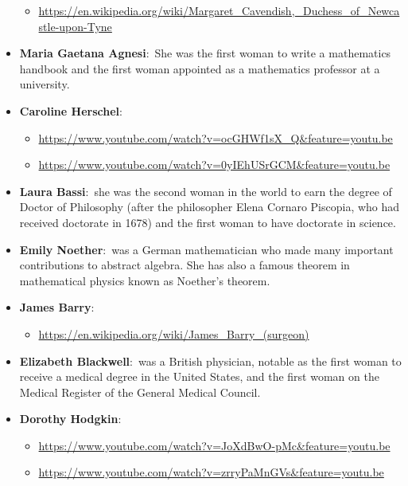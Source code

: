 \documentclass[11pt,a4paper]{article}
\begin{document}
\begin{itemize}
    \begin{itemize}
      \item[] \url{https://en.wikipedia.org/wiki/Margaret_Cavendish,_Duchess_of_Newcastle-upon-Tyne}
    \end{itemize}
    \item \textbf{Maria Gaetana Agnesi}:\ She was the first woman to write a mathematics handbook and the first woman appointed as a mathematics professor at a university.
    \item \textbf{Caroline Herschel}:\ 
    \begin{itemize}
      \item[] \url{https://www.youtube.com/watch?v=ocGHWf1sX_Q&feature=youtu.be}
      \item[] \url{https://www.youtube.com/watch?v=0yIEhUSrGCM&feature=youtu.be}  
    \end{itemize} 
    \item \textbf{Laura Bassi}:\ she was the second woman in the world to earn the degree of Doctor of Philosophy (after the philosopher Elena Cornaro Piscopia, who had received 
    doctorate in 1678) and the first woman to have doctorate in science.
    \item \textbf{Emily Noether}:\ was a German mathematician who made many important contributions to abstract algebra. She has also a famous theorem in mathematical physics known 
    as Noether's theorem.
    \item \textbf{James Barry}:\ 
    \begin{itemize}
      \item[] \url{https://en.wikipedia.org/wiki/James_Barry_(surgeon)} 
    \end{itemize}
    \item \textbf{Elizabeth Blackwell}:\ was a British physician, notable as the first woman to receive a medical degree in the United States, and the first woman on the Medical Register 
    of the General Medical Council.
    \item \textbf{Dorothy Hodgkin}:\
    \begin{itemize}
      \item[] \url{https://www.youtube.com/watch?v=JoXdBwO-pMc&feature=youtu.be}
      \item[] \url{https://www.youtube.com/watch?v=zrryPaMnGVs&feature=youtu.be} 
    \end{itemize}
  \end{itemize}
\end{document}
